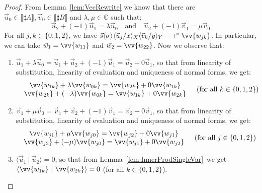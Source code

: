 \documentclass[a4paper,UKenglish,numberwithinsect,pdfa,anonymous]{lipics-v2021}
\theoremstyle{restatestyle}
\newcommand\lra{\longrightarrow}
\newcommand\ansubst[2]{\ensuremath{\langle #1 \rangle_{#2}}}
\def\C{\mathbb{C}}            %
\def\scal#1#2{\langle{#1}~|~{#2}\rangle}
\def\eval{\lra^*}
\def\sem#1{\llbracket#1\rrbracket}
\begin{document}
\begin{proof}
    From Lemma~\ref{lem:VecRewrite} we know that there are $\vec{u}_{0}\in\sem{\sharp A}, \vec{v}_{0}\in\sem{\sharp B}$ and $\lambda,\mu\in\C$ such that:
    \[
    \vec{u}_{2} + (-1) \vec{u}_{1} = \lambda\vec{u}_{0}\quad\text{and}\quad\vec{v}_{2} + (-1) \vec{v}_{1} = \mu \vec{v}_{0}
    \]
    For all $j,k\in\{0,1,2\}$, we have $\vec{s}\ansubst{\sigma}{}\ansubst{\vec{u}_{j}/x}{X}\ansubst{\vec{v}_{k}/y}{Y}\eval\vv{w_{jk}}$. In particular, we can take $\vec{w}_{1}=\vv{w_{11}}$ and $\vec{w}_{2}=\vv{w_{22}}$. Now we observe that:
    \begin{enumerate}
        \item\label{A8:it1} $\vec{u}_{1}+\lambda\vec{u}_{0}= \vec{u}_{1} + \vec{u}_{2} + (-1) \vec{u}_{1}= \vec{u}_{2} + 0\vec{u}_{1}$, so that from linearity of substitution, linearity of evaluation and uniqueness of normal forms, we get:
        \[
        \begin{array}{c c}
            \begin{array}{c}
                \vv{w_{1k}} + \lambda\vv{w_{0k}} = \vv{w_{2k}} + 0 \vv{w_{1k}}\\
                \vv{w_{2k}} + (-\lambda)\vv{w_{0k}} = \vv{w_{1k}} + 0 \vv{w_{2k}}
            \end{array}&
            (\text{for all }k\in\{0,1,2\})
        \end{array}
        \]
        
        \item\label{A8:it2} $\vec{v}_{1}+\mu\vec{v}_{0}= \vec{v}_{1} + \vec{v}_{2} + (-1) \vec{v}_{1}= \vec{v}_{2} + 0\vec{v}_{1}$, so that from linearity of substitution, linearity of evaluation and uniqueness of normal forms, we get:
        \[
        \begin{array}{c c}
            \begin{array}{c}
                \vv{w_{j1}} + \mu\vv{w_{j0}} = \vv{w_{j2}} + 0 \vv{w_{j1}}\\
                \vv{w_{j2}} + (-\mu)\vv{w_{j0}} = \vv{w_{j1}} + 0 \vv{w_{j2}}
            \end{array}&
            (\text{for all }j\in\{0,1,2\})
        \end{array}
        \]
        
        \item\label{A8:it3} $\scal{\vec{u}_{1}}{\vec{u}_{2}}=0$, so that from Lemma~\ref{lem:InnerProdSingleVar}~we get $\scal{\vv{w_{1k}}}{\vv{w_{2k}}}=0$ (for all $k\in\{0,1,2\}$).
        

\end{enumerate}
\end{proof}
\end{document}
